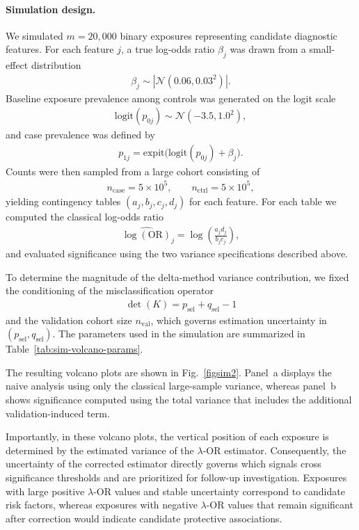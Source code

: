 \documentclass[pdflatex,sn-mathphys-num]{sn-jnl}%
\def\EQSP{3pt}
\newcommand{\cgather}[2][\EQSP]{\begingroup\setlength\abovedisplayskip{#1}\setlength\belowdisplayskip{#1}\begin{gather} #2 \end{gather}\endgroup\noindent}
\theoremstyle{thmstyleone}%
\theoremstyle{thmstyletwo}%
\theoremstyle{thmstylethree}%
\begin{document}
\paragraph{Simulation design.}
We simulated \(m=20{,}000\) binary exposures representing candidate diagnostic
features. For each feature \(j\), a true log-odds ratio $\beta_j$
was drawn from a small-effect distribution
\cgather{
\beta_j \sim |\mathcal{N}(0.06,0.03^2)|.
}
Baseline exposure prevalence among controls was generated on the logit scale
\cgather{
\mathrm{logit}(p_{0j}) \sim \mathcal{N}(-3.5,1.0^2),
}
and case prevalence was defined by
\cgather{
p_{1j}=\mathrm{expit}\bigl(\mathrm{logit}(p_{0j})+\beta_j\bigr).
}
Counts were then sampled from a large cohort consisting of
\cgather{
n_{\mathrm{case}} = 5\times 10^{5},
\qquad
n_{\mathrm{ctrl}} = 5\times 10^{5},
}
yielding contingency tables \((a_j,b_j,c_j,d_j)\) for each feature.
For each table we computed the classical log-odds ratio
\cgather{
\widehat{\log(\mathrm{OR})}_j=\log\!\left(\frac{a_j d_j}{b_j c_j}\right),
}
and evaluated significance using the two variance specifications described above.

To determine the magnitude of the delta-method variance contribution, we fixed the
conditioning of the misclassification operator
\cgather{
\det(K)=p_{\mathrm{sel}}+q_{\mathrm{sel}}-1
}
and the validation cohort size \(n_{\mathrm{val}}\), which governs estimation
uncertainty in \((p_{\mathrm{sel}},q_{\mathrm{sel}})\). The parameters used in the
simulation are summarized in Table~\ref{tab:sim-volcano-params}.

The resulting volcano plots are shown in Fig.~\ref{figsim2}. Panel~a displays
the naive analysis using only the classical large-sample variance, whereas
panel~b shows significance computed using the total variance that includes the
additional validation-induced term.


Importantly, in these volcano plots, the vertical position of each exposure is determined by the  estimated variance of the $\lambda$-OR estimator. Consequently, the uncertainty of the corrected estimator directly governs which signals cross significance thresholds and are prioritized for follow-up investigation. Exposures with large positive $\lambda$-OR values and stable uncertainty correspond to candidate risk factors, whereas exposures with negative $\lambda$-OR values that remain significant after correction would  indicate candidate protective associations. %
\end{document}
